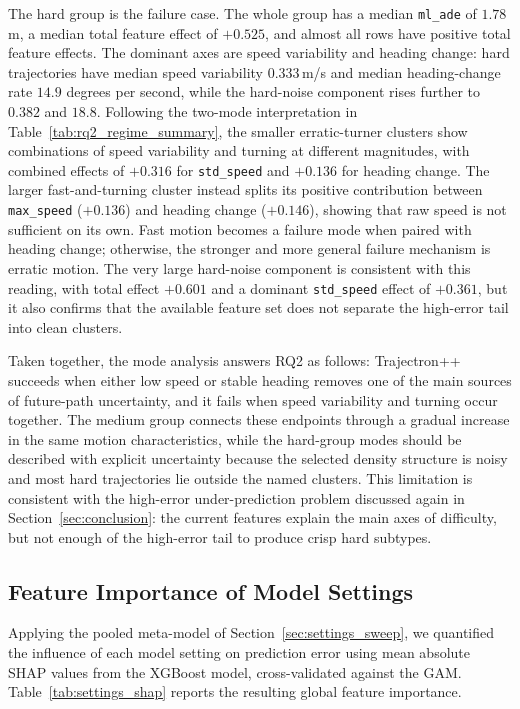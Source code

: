 \documentclass[12pt]{article}
\begin{document}
The hard group is the failure case. The whole group has a median \texttt{ml\_ade} of $1.78$ m, a median total feature effect of $+0.525$, and almost all rows have positive total feature effects. The dominant axes are speed variability and heading change: hard trajectories have median speed variability $0.333$\,m/s and median heading-change rate $14.9$ degrees per second, while the hard-noise component rises further to $0.382$ and $18.8$. Following the two-mode interpretation in Table~\ref{tab:rq2_regime_summary}, the smaller erratic-turner clusters show combinations of speed variability and turning at different magnitudes, with combined effects of $+0.316$ for \texttt{std\_speed} and $+0.136$ for heading change. The larger fast-and-turning cluster instead splits its positive contribution between \texttt{max\_speed} ($+0.136$) and heading change ($+0.146$), showing that raw speed is not sufficient on its own. Fast motion becomes a failure mode when paired with heading change; otherwise, the stronger and more general failure mechanism is erratic motion. The very large hard-noise component is consistent with this reading, with total effect $+0.601$ and a dominant \texttt{std\_speed} effect of $+0.361$, but it also confirms that the available feature set does not separate the high-error tail into clean clusters.

Taken together, the mode analysis answers RQ2 as follows: Trajectron++ succeeds when either low speed or stable heading removes one of the main sources of future-path uncertainty, and it fails when speed variability and turning occur together. The medium group connects these endpoints through a gradual increase in the same motion characteristics, while the hard-group modes should be described with explicit uncertainty because the selected density structure is noisy and most hard trajectories lie outside the named clusters. This limitation is consistent with the high-error under-prediction problem discussed again in Section~\ref{sec:conclusion}: the current features explain the main axes of difficulty, but not enough of the high-error tail to produce crisp hard subtypes.

\newpage
\subsection{Feature Importance of Model Settings}
\label{sec:settings_importance}

Applying the pooled meta-model of Section~\ref{sec:settings_sweep}, we quantified the influence of each model setting on prediction error using mean absolute SHAP values from the XGBoost model, cross-validated against the GAM. Table~\ref{tab:settings_shap} reports the resulting global feature importance.
\end{document}
